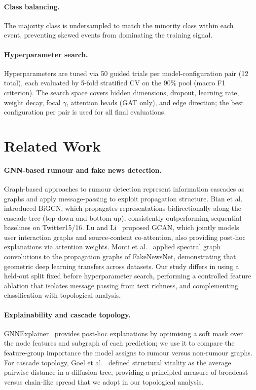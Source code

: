 \documentclass[runningheads]{llncs}
\begin{document}
\paragraph{Class balancing.}
The majority class is undersampled to match the minority class within each
event, preventing skewed events from dominating the training signal.

\paragraph{Hyperparameter search.}
Hyperparameters are tuned via 50 guided trials per model-configuration pair
(12 total), each evaluated by 5-fold stratified CV on the 90\% pool (macro F1
criterion). The search space covers hidden dimensions, dropout, learning rate,
weight decay, focal $\gamma$, attention heads (GAT only), and edge direction;
the best configuration per pair is used for all final evaluations.

\section{Related Work}

\paragraph{GNN-based rumour and fake news detection.}
Graph-based approaches to rumour detection represent information cascades as graphs
and apply message-passing to exploit propagation structure. Bian et
al.~\cite{bian2020bigcn} introduced BiGCN, which propagates representations
bidirectionally along the cascade tree (top-down and bottom-up), consistently
outperforming sequential baselines on Twitter15/16. Lu and Li~\cite{lu2020gcan}
proposed GCAN, which jointly models user interaction graphs and source-content
co-attention, also providing post-hoc explanations via attention weights. Monti et
al.~\cite{monti2019fakenews} applied spectral graph convolutions to the propagation
graphs of FakeNewsNet, demonstrating that geometric deep learning transfers across
datasets. Our study differs in using a held-out split fixed before hyperparameter search,
performing a controlled feature ablation that isolates message passing from text
richness, and complementing classification with topological analysis.

\paragraph{Explainability and cascade topology.}
GNNExplainer~\cite{ying2019gnnexplainer} provides post-hoc explanations by
optimising a soft mask over the node features and subgraph of each prediction;
we use it to compare the feature-group importance the model assigns to rumour
versus non-rumour graphs. For cascade topology, Goel et
al.~\cite{goel2016structural} defined structural virality as the average
pairwise distance in a diffusion tree, providing a principled measure of broadcast versus chain-like spread that we
adopt in our topological analysis.
\end{document}
